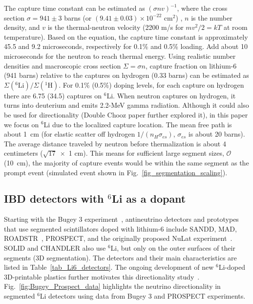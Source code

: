 \documentclass[tightenlines,
twocolumn,prl,notitlepage,nofootinbib,preprintnumbers,longbibliography]{revtex4-1}
\begin{document}
The capture time constant can be estimated as $(\sigma n v)^{-1}$, where the cross section $\sigma = 941 \pm 3$ barns  (or $(9.41 \pm 0.03) \times 10^{-22}$ cm$^2$) \cite{osti_6280345}, $n$ is the number density, and $v$ is the thermal-neutron velocity (2200 m/s for $mv^2 /2 = kT$ at room temperature).
Based on the equation, the capture time constant is approximately 45.5 and 9.2 microseconds, respectively for 0.1\% and 0.5\% loading. Add about 10 microseconds for the neutron to reach thermal energy.
Using realistic number densities %
and macroscopic cross section $\Sigma = \sigma n$, capture fraction on lithium-6 (941 barns) relative to the captures on hydrogen (0.33 barns) can be estimated as $\Sigma(^6\mathrm{Li}) / \Sigma (^1\mathrm{H})$.
For 0.1\% (0.5\%) doping levels, for each capture on hydrogen there are 6.75 (34.5) captures on $^6$Li.
When neutron captures on hydrogen, it turns into deuterium and emits 2.2-MeV gamma radiation. Although it could also be used for directionality (Double Chooz paper further explored it), in this paper we focus on $^6$Li due to the localized capture location.
The mean free path is about 1~cm (for elastic scatter off hydrogen $1/ (n_H \sigma_{es})$, $\sigma_{es}$ is about 20 barns).
The average distance traveled by neutron before thermalization is about 4 centimeters ($\sqrt{17} \; \times$ 1 cm).
This means for sufficient large segment sizes, $\mathcal{O}$(10~cm), the 
majority of capture events would be within the same segment as the prompt event (simulated event shown in Fig.~\ref{fig_segmentation_scaling}).

\subsection{IBD detectors with $^6$Li as a dopant}
Starting with the Bugey 3 experiment~\cite{Bugey3_1995, Bugey3_1996}, antineutrino detectors and prototypes that use segmented scintillators doped with lithium-6 include SANDD, MAD, ROADSTR~\cite{MobileAntineutrinoDemonstratorProject:2025sna}, PROSPECT, and the originally proposed NuLat experiment~\cite{NuLat:2015wgu}.
SOLID and CHANDLER also use $^6$Li, but only on the outer surfaces of their segments (3D segmentation). The detectors and their main characteristics are listed in Table~\ref{tab_Li6_detectors}. The ongoing development of new $^6$Li-doped 3D-printable plastics further motivates this directionality study~\cite{KIM2023168537, Barr:2025fxg}.
Fig.~\ref{fig:Bugey_Prospect_data} highlights the neutrino directionality in segmented $^6$Li detectors using data from Bugey 3 and PROSPECT experiments.
\end{document}
